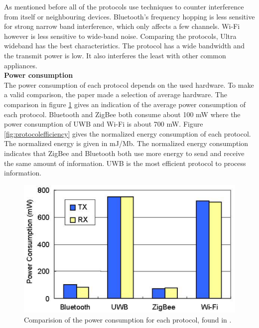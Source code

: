 \documentclass[10pt,a4paper]{article}
\begin{document}
As mentioned before all of the protocols use techniques to counter interference from itself or neighbouring devices. Bluetooth's frequency hopping is less sensitive for strong narrow band interference, which only affects a few channels. Wi-Fi however is less sensitive to wide-band noise. \cite{Bluetoothwifisurveyandcomparison} Comparing the protocols, Ultra wideband has the best characteristics. The protocol has a wide bandwidth and the transmit power is low. It also interferes the least with other common appliances.\\

\textbf{Power consumption}\\
The power consumption of each protocol depends on the used hardware. To make a valid comparison, the paper \cite{comparitivestudywirelessprotocols} made a selection of average hardware. The comparison in figure \ref{fig:protocolenergy} gives an indication of the average power consumption of each protocol. Bluetooth and ZigBee both consume about 100 mW where the power consumption of UWB and Wi-Fi is about 700 mW. Figure \ref{fig:protocolefficiency} gives the normalized energy consumption of each protocol. The normalized energy is given in mJ/Mb. The normalized energy consumption indicates that ZigBee and Bluetooth both use more energy to send and receive the same amount of information. UWB is the most efficient protocol to process information.

\begin{figure}[H]
   \centering
   \includegraphics[width=1\textwidth]{images/protocolenergy.png}
   \caption{Comparision of the power consumption for each protocol, found in \cite{comparitivestudywirelessprotocols}.}
   \label{fig:protocolenergy}
\end{figure}
\end{document}
